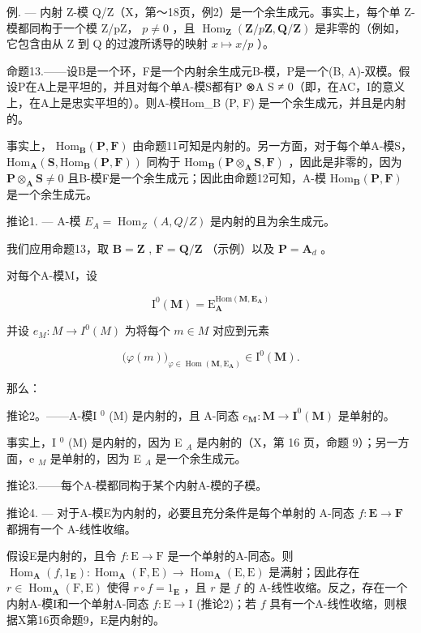 例. --- 内射 Z-模 Q/Z（X，第～18页，例2）是一个余生成元。事实上，每个单 Z-模都同构于一个模 Z/pZ， \(p \neq 0\) ，且 \(\operatorname{Hom}_{\mathbf{Z}}(\mathbf{Z}/p\mathbf{Z}, \mathbf{Q}/\mathbf{Z})\) 是非零的（例如，它包含由从 Z 到 Q 的过渡所诱导的映射 \(x \mapsto x/p\) ）。

命题13.——设B是一个环，F是一个内射余生成元B-模，P是一个(B, A)-双模。假设P在A上是平坦的，并且对每个单A-模S都有P ⊗A S ≠ 0（即，在AC，I的意义上，在A上是忠实平坦的）。则A-模Hom\_B (P, F) 是一个余生成元，并且是内射的。

事实上， \(\mathrm{Hom}_{\mathbf{B}}(\mathbf{P},\mathbf{F})\) 由命题11可知是内射的。另一方面，对于每个单A-模S， \(\mathrm{Hom}_{\mathbf{A}}(\mathbf{S},\mathrm{Hom}_{\mathbf{B}}(\mathbf{P},\mathbf{F}))\) 同构于 \(\mathrm{Hom}_{\mathbf{B}}(\mathbf{P}\otimes_{\mathbf{A}}\mathbf{S},\mathbf{F})\) ，因此是非零的，因为 \(\mathbf{P}\otimes_{\mathbf{A}}\mathbf{S}\neq 0\) 且B-模F是一个余生成元；因此由命题12可知，A-模 \(\mathrm{Hom}_{\mathbf{B}}(\mathbf{P},\mathbf{F})\) 是一个余生成元。

推论1. --- A-模 \(E_{A} = \operatorname{Hom}_{Z}(A, Q/Z)\) 是内射的且为余生成元。

我们应用命题13，取 \(\mathbf{B} = \mathbf{Z}\) , \(\mathbf{F} = \mathbf{Q} / \mathbf{Z}\) （示例）以及 \(\mathbf{P} = \mathbf{A}_d\) 。

对每个A-模M，设

\[
\mathrm{I} ^ {0} (\mathbf {M}) = \mathrm{E} _ {\mathbf {A}} ^ {\mathrm{Hom} (\mathbf {M}, \mathbf {E} _ {\mathbf {A}})}
\]

并设 \(e_{M}: M \to I^{0}(M)\) 为将每个 \(m \in M\) 对应到元素

\[
\big (\varphi (m) \big) _ {\varphi \in \operatorname{Hom} (\mathbf {M}, \mathrm{E} _ {\mathbf {A}})} \in \mathrm{I} ^ {0} (\mathbf {M}).
\]

那么：

推论2。——A-模I \(^{0}\) (M) 是内射的，且 A-同态 \(e_{\mathbf{M}} : \mathbf{M} \to \mathbf{I}^{0}(\mathbf{M})\) 是单射的。

事实上，I \(^{0}\) (M) 是内射的，因为 E \(_{A}\) 是内射的（X，第 16 页，命题 9）；另一方面，e \(_{M}\) 是单射的，因为 E \(_{A}\) 是一个余生成元。

推论3.——每个A-模都同构于某个内射A-模的子模。

推论4. --- 对于A-模E为内射的，必要且充分条件是每个单射的 A-同态 \(f: \mathbf{E} \to \mathbf{F}\) 都拥有一个 A-线性收缩。

假设E是内射的，且令 \(f: \mathrm{E} \to \mathrm{F}\) 是一个单射的A-同态。则 \(\operatorname{Hom}_{\mathbf{A}}(f, 1_{\mathbf{E}}): \operatorname{Hom}_{\mathbf{A}}(\mathrm{F}, \mathrm{E}) \to \operatorname{Hom}_{\mathbf{A}}(\mathrm{E}, \mathrm{E})\) 是满射；因此存在 \(r \in \operatorname{Hom}_{\mathbf{A}}(\mathrm{F}, \mathrm{E})\) 使得 \(r \circ f = 1_{\mathbf{E}}\) ，且 \(r\) 是 \(f\) 的 A-线性收缩。反之，存在一个内射A-模I和一个单射A-同态 \(f: \mathrm{E} \to \mathrm{I}\) (推论2)；若 \(f\) 具有一个A-线性收缩，则根据X第16页命题9，E是内射的。

